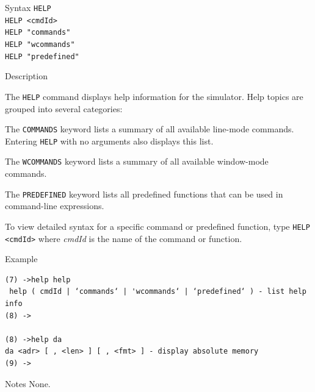 %
%
\pagebreak
{}

\begin{iPageDescEntry}{Syntax}
\texttt{HELP } \\
\texttt{HELP <cmdId> } \\
\texttt{HELP "commands" } \\
\texttt{HELP "wcommands" } \\ 
\texttt{HELP "predefined" }
\end{iPageDescEntry}

\begin{iPageDescEntry}{Description}

The \texttt{HELP} command displays help information for the simulator. Help topics are grouped into several categories:

\begin{smallGapItemize}
  \item The \texttt{COMMANDS} keyword lists a summary of all available line-mode commands. Entering \texttt{HELP} with no arguments also displays this list.
  \item The \texttt{WCOMMANDS} keyword lists a summary of all available window-mode commands.
  \item The \texttt{PREDEFINED} keyword lists all predefined functions that can be used in command-line expressions.
\end{smallGapItemize}

To view detailed syntax for a specific command or predefined function, type \texttt{HELP <cmdId>} where \textit{cmdId} is the name of the command or function.


\end{iPageDescEntry}

\begin{iPageDescOpEntry}{Example}
\begin{lstlisting}[style=iPageOpStyle]
(7) ->help help
 help ( cmdId | ‘commands‘ | 'wcommands‘ | ‘predefined‘ ) - list help info
(8) ->

(8) ->help da
da <adr> [ , <len> ] [ , <fmt> ] - display absolute memory
(9) ->
\end{lstlisting}
\end{iPageDescOpEntry}

\begin{iPageDescEntry}{Notes}
None.
\end{iPageDescEntry}
